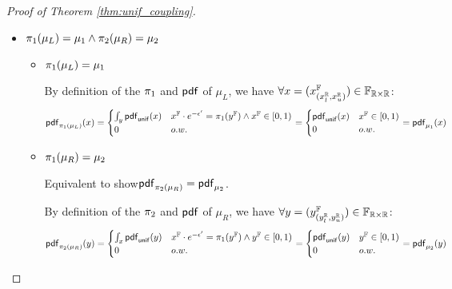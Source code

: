 \documentclass[a4paper,11pt]{article}
\begin{document}
\begin{proof}[Proof of Theorem \ref{thm:unif_coupling}]
\begin{itemize}
	\begin{itemize}
		\item $\supp(\mu_L) \subseteq \Psi$ 
		\\
		By definition of the $\pdf$ of $\mu_L$, 
		$\forall \pdf_{\mu_R}(x, y) > 0$,
		we have 
		$\pi_1(x) \cdot e^{-\epsilon'} = \pi(y) \in \Psi$ 
		\\%
		Then we can derive $\supp(\mu_L) \in \Psi$
		\item $\supp(\mu_R) \subseteq \Psi$
		\\
		By definition of the $\pdf$ of $\mu_L$, 
		$\forall \pdf_{\mu_L}(x, y) > 0$,
		we have
		$\pi_1(x) \cdot e^{-\epsilon'} = \pi(y) \in \Psi$ 
		\\
		Then we can derive $\supp(\mu_L) \in \Psi$
	\end{itemize}		
%
	\item $\pi_1(\mu_L) = \mu_1 \land \pi_2(\mu_R) = \mu_2$
	
	\begin{itemize}
		\item $\pi_1(\mu_L) = \mu_1$ 


		By definition of the $\pi_1$ and $\pdf$ of $\mu_L$, we have $\forall x = (x^{\mathbb{F}}_{(x^{\mathbb{R}}_l, x^{\mathbb{R}}_u)}) \in \mathbb{F}_{\mathbb{R} \times \mathbb{R}}$:
		\[
			\mathsf{pdf}_{\pi_1(\mu_L)}(x) = 
			\begin{cases}
			\int_{y}\mathsf{pdf}_{\mathsf{unif}}(x) 
			& x^{\mathbb{F}} \cdot e^{-\epsilon'} = \pi_1(y^{\mathbb{F}}) 
			\land x^{\mathbb{F}} \in [0, 1)\\
			0       & o.w.
			\end{cases} 
			= 
			\begin{cases}
			\mathsf{pdf}_{\mathsf{unif}}(x) & x^{\mathbb{F}} \in [0, 1)\\
			0       & o.w.
			\end{cases}
			=
			\mathsf{pdf}_{\mu_1}(x)
		\]

		\item $\pi_1(\mu_R) = \mu_2$ 

		Equivalent to show$\mathsf{pdf}_{\pi_2(\mu_R)}  = \mathsf{pdf}_{\mu_2}$.

		By definition of the $\pi_2$ and $\pdf$ of $\mu_R$, we have $\forall y = (y^{\mathbb{F}}_{(y^{\mathbb{R}}_l, y^{\mathbb{R}}_u)}) \in \mathbb{F}_{\mathbb{R} \times \mathbb{R}}$:
		\[
			\mathsf{pdf}_{\pi_2(\mu_R)}(y) = 
			\begin{cases}
			\int_{x}\mathsf{pdf}_{\mathsf{unif}}(y) 
			& x^{\mathbb{F}} \cdot e^{-\epsilon'} = \pi_1(y^{\mathbb{F}}) 
			\land y^{\mathbb{F}} \in [0, 1)\\
			0       & o.w.
			\end{cases} 
			= 
			\begin{cases}
			\mathsf{pdf}_{\mathsf{unif}}(y) & y^{\mathbb{F}} \in [0, 1)\\
			0       & o.w.
			\end{cases}
			=
			\mathsf{pdf}_{\mu_2}(y)
		\]
	\end{itemize}	


\end{itemize}
\end{proof}
\end{document}

